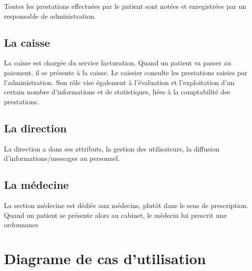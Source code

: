 Toutes les prestations effectuées par le patient sont notées et enregistrées par un
responsable de administration.


\subsection{La caisse}
La caisse est chargée du service facturation. Quand un patient va passer au paiement, il se
présente à la caisse. Le caissier consulte les prestations saisies par l'administration.
Son rôle vise également à l'évaluation et l'exploitation d'un certain nombre d'informations
et de statistiques, liées à la comptabilité des prestations.

\subsection{La direction}
La direction a dans ses attributs, la gestion des utilisateurs, la diffusion
d'informations/messages au personnel.

\subsection{La médecine}

La section médecine est dédiée aux médecins, plutôt dans le sens de prescription. Quand un
patient se présente alors au cabinet, le médecin lui prescrit une ordonnance









	\newpage
	
	
	
	
	
	
	
	
	
	
	
	\section{Diagrame de cas d'utilisation}
	

